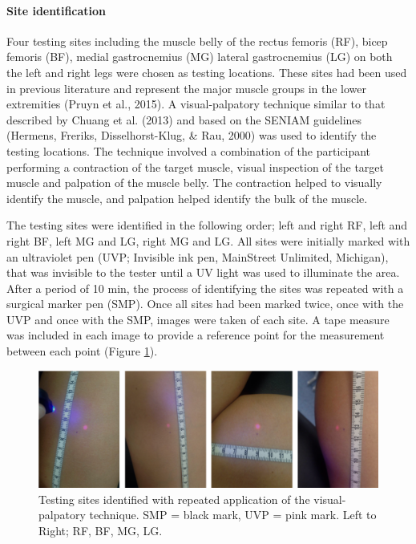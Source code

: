 \documentclass[man,floatsintext]{apa6}
\let\oldparagraph\paragraph
\renewcommand{\paragraph}[1]{\oldparagraph{#1}\mbox{}}
\begin{document}
\hypertarget{site-identification}{%
\paragraph{Site identification}\label{site-identification}}

Four testing sites including the muscle belly of the rectus femoris (RF), bicep femoris (BF), medial gastrocnemius (MG) lateral gastrocnemius (LG) on both the left and right legs were chosen as testing locations. These sites had been used in previous literature and represent the major muscle groups in the lower extremities (Pruyn et al., 2015).
A visual-palpatory technique similar to that described by Chuang et al. (2013) and based on the SENIAM guidelines (Hermens, Freriks, Disselhorst-Klug, \& Rau, 2000) was used to identify the testing locations.
The technique involved a combination of the participant performing a contraction of the target muscle, visual inspection of the target muscle and palpation of the muscle belly.
The contraction helped to visually identify the muscle, and palpation helped identify the bulk of the muscle.

The testing sites were identified in the following order; left and right RF, left and right BF, left MG and LG, right MG and LG.
All sites were initially marked with an ultraviolet pen (UVP; Invisible ink pen, MainStreet Unlimited, Michigan), that was invisible to the tester until a UV light was used to illuminate the area.
After a period of 10 min, the process of identifying the sites was repeated with a surgical marker pen (SMP).
Once all sites had been marked twice, once with the UVP and once with the SMP, images were taken of each site.
A tape measure was included in each image to provide a reference point for the measurement between each point (Figure \ref{fig:test-sites}).

\begin{figure}[H]

{\centering \includegraphics[width=1\linewidth]{figs/measures/examples} 

}

\caption{Testing sites identified with repeated application of the visual-palpatory technique. SMP = black mark, UVP = pink mark. Left to Right; RF, BF, MG, LG.}\label{fig:test-sites}
\end{figure}
\end{document}
